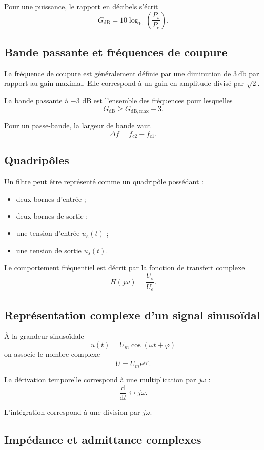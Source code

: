 Pour une puissance, le rapport en décibels s'écrit
\[
G_{\mathrm{dB}}=10\log_{10}\left(\frac{P_s}{P_e}\right).
\]

\subsection{Bande passante et fréquences de coupure}

La fréquence de coupure est généralement définie par une diminution de $\SI{3}{\decibel}$ par rapport au gain maximal. Elle correspond à un gain en amplitude divisé par $\sqrt{2}$.

La bande passante à $-3$ dB est l'ensemble des fréquences pour lesquelles
\[
G_{\mathrm{dB}}\geq G_{\mathrm{dB,max}}-3.
\]

Pour un passe-bande, la largeur de bande vaut
\[
\Delta f=f_{c2}-f_{c1}.
\]

\subsection{Quadripôles}

Un filtre peut être représenté comme un quadripôle possédant :
\begin{itemize}
  \item deux bornes d'entrée ;
  \item deux bornes de sortie ;
  \item une tension d'entrée $u_e(t)$ ;
  \item une tension de sortie $u_s(t)$.
\end{itemize}

Le comportement fréquentiel est décrit par la fonction de transfert complexe
\[
H(j\omega)=\frac{\underline{U_s}}{\underline{U_e}}.
\]

\subsection{Représentation complexe d'un signal sinusoïdal}

À la grandeur sinusoïdale
\[
u(t)=U_m\cos(\omega t+\varphi)
\]
on associe le nombre complexe
\[
\underline{U}=U_m e^{j\varphi}.
\]

La dérivation temporelle correspond à une multiplication par $j\omega$ :
\[
\frac{\mathrm d}{\mathrm dt}\longleftrightarrow j\omega.
\]

L'intégration correspond à une division par $j\omega$.

\subsection{Impédance et admittance complexes}

